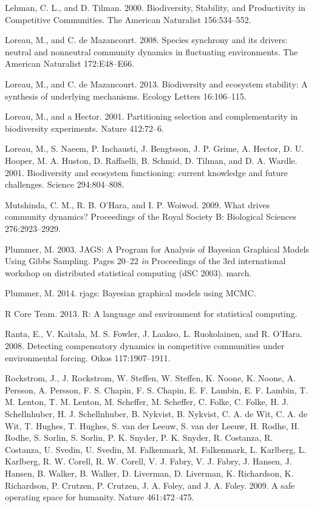 \documentclass[12pt,]{article}
\begin{document}
Lehman, C. L., and D. Tilman. 2000. Biodiversity, Stability, and
Productivity in Competitive Communities. The American Naturalist
156:534--552.

Loreau, M., and C. {{de Mazancourt}}. 2008. Species synchrony and its
drivers: neutral and nonneutral community dynamics in fluctuating
environments. The American Naturalist 172:E48--E66.

Loreau, M., and C. {{de Mazancourt}}. 2013. Biodiversity and ecosystem
stability: A synthesis of underlying mechanisms. Ecology Letters
16:106--115.

Loreau, M., and a Hector. 2001. Partitioning selection and
complementarity in biodiversity experiments. Nature 412:72--6.

Loreau, M., S. Naeem, P. Inchausti, J. Bengtsson, J. P. Grime, A.
Hector, D. U. Hooper, M. A. Huston, D. Raffaelli, B. Schmid, D. Tilman,
and D. A. Wardle. 2001. Biodiversity and ecosystem functioning: current
knowledge and future challenges. Science 294:804--808.

Mutshinda, C. M., R. B. O'Hara, and I. P. Woiwod. 2009. What drives
community dynamics? Proceedings of the Royal Society B: Biological
Sciences 276:2923--2929.

Plummer, M. 2003. JAGS: A Program for Analysis of Bayesian Graphical
Models Using Gibbs Sampling. Pages 20--22 \emph{in} Proceedings of the
3rd international workshop on distributed statistical computing (dSC
2003). march.

Plummer, M. 2014. rjags: Bayesian graphical models using MCMC.

R Core Team. 2013. R: A language and environment for statistical
computing.

Ranta, E., V. Kaitala, M. S. Fowler, J. Laakso, L. Ruokolainen, and R.
O'Hara. 2008. Detecting compensatory dynamics in competitive communities
under environmental forcing. Oikos 117:1907--1911.

Rockstrom, J., J. Rockstrom, W. Steffen, W. Steffen, K. Noone, K. Noone,
A. Persson, A. Persson, F. S. Chapin, F. S. Chapin, E. F. Lambin, E. F.
Lambin, T. M. Lenton, T. M. Lenton, M. Scheffer, M. Scheffer, C. Folke,
C. Folke, H. J. Schellnhuber, H. J. Schellnhuber, B. Nykvist, B.
Nykvist, C. A. de Wit, C. A. de Wit, T. Hughes, T. Hughes, S. van der
Leeuw, S. van der Leeuw, H. Rodhe, H. Rodhe, S. Sorlin, S. Sorlin, P. K.
Snyder, P. K. Snyder, R. Costanza, R. Costanza, U. Svedin, U. Svedin, M.
Falkenmark, M. Falkenmark, L. Karlberg, L. Karlberg, R. W. Corell, R. W.
Corell, V. J. Fabry, V. J. Fabry, J. Hansen, J. Hansen, B. Walker, B.
Walker, D. Liverman, D. Liverman, K. Richardson, K. Richardson, P.
Crutzen, P. Crutzen, J. A. Foley, and J. A. Foley. 2009. A safe
operating space for humanity. Nature 461:472--475.
\end{document}
